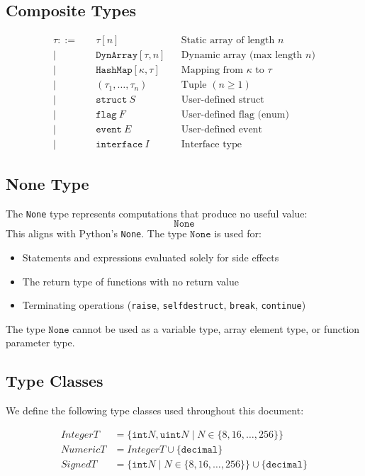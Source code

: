 \documentclass[11pt]{article}
\newcommand{\kw}[1]{\texttt{#1}}
\begin{document}
\subsection{Composite Types}

\begin{align*}
\tau ::= \quad & \tau[n] && \text{Static array of length } n \\
\mid \quad & \kw{DynArray}[\tau, n] && \text{Dynamic array (max length } n \text{)} \\
\mid \quad & \kw{HashMap}[\kappa, \tau] && \text{Mapping from } \kappa \text{ to } \tau \\
\mid \quad & (\tau_1, \ldots, \tau_n) && \text{Tuple } (n \geq 1) \\
\mid \quad & \kw{struct}\ S && \text{User-defined struct} \\
\mid \quad & \kw{flag}\ F && \text{User-defined flag (enum)} \\
\mid \quad & \kw{event}\ E && \text{User-defined event} \\
\mid \quad & \kw{interface}\ I && \text{Interface type}
\end{align*}

\subsection{None Type}

The \kw{None} type represents computations that produce no useful value:
\[
\kw{None}
\]
This aligns with Python's \texttt{None}. The type $\kw{None}$ is used for:
\begin{itemize}
  \item Statements and expressions evaluated solely for side effects
  \item The return type of functions with no return value
  \item Terminating operations (\kw{raise}, \kw{selfdestruct}, \kw{break}, \kw{continue})
\end{itemize}
The type $\kw{None}$ cannot be used as a variable type, array element type,
or function parameter type.

\subsection{Type Classes}

We define the following type classes used throughout this document:

\begin{align*}
\mathit{IntegerT} &= \{\kw{int}N, \kw{uint}N \mid N \in \{8,16,\ldots,256\}\} \\
\mathit{NumericT} &= \mathit{IntegerT} \cup \{\kw{decimal}\} \\
\mathit{SignedT} &= \{\kw{int}N \mid N \in \{8,16,\ldots,256\}\} \cup \{\kw{decimal}\}
\end{align*}
\end{document}
